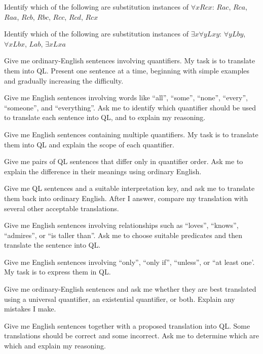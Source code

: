 \solutions
\problempart
\label{pr.subinstanceQL}
\begin{earg}
\item Identify which of the following are substitution instances of $\forall x Rcx$: $Rac$, $Rca$, $Raa$, $Rcb$, $Rbc$, $Rcc$, $Rcd$, $Rcx$
\item Identify which of the following are substitution instances of $\exists x\forall y Lxy$:
$\forall y Lby$, $\forall x Lbx$, $Lab$, $\exists x Lxa$
\end{earg}


\begin{genaipractice}[]

\item Give me ordinary-English sentences involving quantifiers. My task is to translate them into QL. Present one sentence at a time, beginning with simple examples and gradually increasing the difficulty.
\item Give me English sentences involving words like ``all'', ``some'', ``none'', ``every'', ``someone'', and ``everything''. Ask me to identify which quantifier should be used to translate each sentence into QL, and to explain my reasoning.
\item Give me English sentences containing multiple quantifiers. My task is to translate them into QL and explain the scope of each quantifier.
\item Give me pairs of QL sentences that differ only in quantifier order. Ask me to explain the difference in their meanings using ordinary English.
\item Give me QL sentences and a suitable interpretation key, and ask me to translate them back into ordinary English. After I answer, compare my translation with several other acceptable translations.
\item Give me English sentences involving relationships such as ``loves'', ``knows'', ``admires'', or ``is taller than''. Ask me to choose suitable predicates and then translate the sentence into QL.
\item Give me English sentences involving ``only'', ``only if'', ``unless'', or ``at least one'. My task is to express them in QL.
\item Give me ordinary-English sentences and ask me whether they are best translated using a universal quantifier, an existential quantifier, or both. Explain any mistakes I make.
\item Give me English sentences together with a proposed translation into QL. Some translations should be correct and some incorrect. Ask me to determine which are which and explain my reasoning.

\end{genaipractice}
